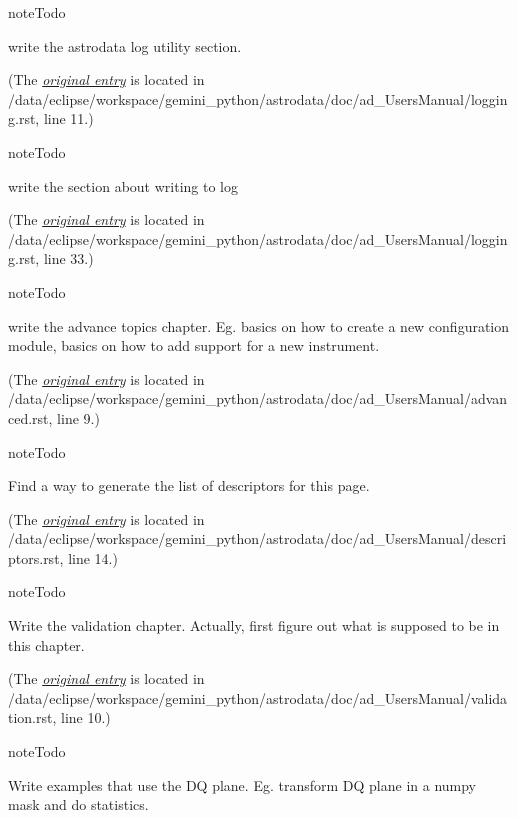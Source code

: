 \documentclass[letterpaper,10pt,english]{sphinxmanual}
\begin{document}
\begin{notice}{note}{Todo}

write the astrodata log utility section.
\end{notice}

(The {\hyperref[logging:index-0]{\emph{original entry}}} is located in  /data/eclipse/workspace/gemini\_python/astrodata/doc/ad\_UsersManual/logging.rst, line 11.)

\begin{notice}{note}{Todo}

write the section about writing to log
\end{notice}

(The {\hyperref[logging:index-1]{\emph{original entry}}} is located in  /data/eclipse/workspace/gemini\_python/astrodata/doc/ad\_UsersManual/logging.rst, line 33.)

\begin{notice}{note}{Todo}

write the advance topics chapter.  Eg. basics on how to create a new configuration
module, basics on how to add support for a new instrument.
\end{notice}

(The {\hyperref[advanced:index-0]{\emph{original entry}}} is located in  /data/eclipse/workspace/gemini\_python/astrodata/doc/ad\_UsersManual/advanced.rst, line 9.)

\begin{notice}{note}{Todo}

Find a way to generate the list of descriptors for this page.
\end{notice}

(The {\hyperref[descriptors:index-0]{\emph{original entry}}} is located in  /data/eclipse/workspace/gemini\_python/astrodata/doc/ad\_UsersManual/descriptors.rst, line 14.)

\begin{notice}{note}{Todo}

Write the validation chapter.  Actually, first figure out what is supposed to be in this chapter.
\end{notice}

(The {\hyperref[validation:index-0]{\emph{original entry}}} is located in  /data/eclipse/workspace/gemini\_python/astrodata/doc/ad\_UsersManual/validation.rst, line 10.)

\begin{notice}{note}{Todo}

Write examples that use the DQ plane.  Eg. transform DQ plane in a numpy mask
and do statistics.
\end{notice}
\end{document}
